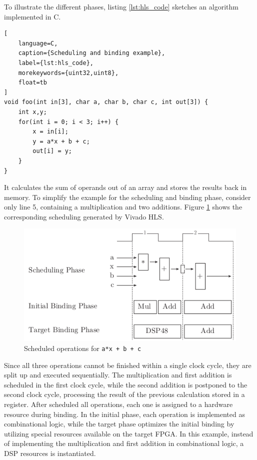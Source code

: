 To illustrate the different phases, listing \ref{lst:hls_code} sketches an
algorithm implemented in C. 
\begin{lstlisting}[
	language=C,
	caption={Scheduling and binding example},
	label={lst:hls_code},
	morekeywords={uint32,uint8},
	float=tb
]
void foo(int in[3], char a, char b, char c, int out[3]) {
	int x,y;
	for(int i = 0; i < 3; i++) {
		x = in[i];
		y = a*x + b + c;
		out[i] = y;
	}
}
\end{lstlisting}
It calculates the sum of operands out of an array and stores the results back
in memory. To simplify the example for the scheduling and binding phase,
consider only line 5, containing a multiplication and two additions. Figure
\ref{fig:hls_sb} shows the corresponding scheduling generated by Vivado
\ac{HLS}.
\begin{figure}[tb]
	\centering
	\includegraphics{../figures/hls_sb}
	\caption{Scheduled operations for \lstinline{a*x + b + c}}
	\label{fig:hls_sb}
\end{figure}
Since all three operations cannot be finished within a single clock cycle,
they are split up and executed sequentially. The multiplication and first
addition is scheduled in the first clock cycle, while the second addition is
postponed to the second clock cycle, processing the result of the previous
calculation stored in a register. After scheduled all operations, each one is
assigned to a hardware resource during binding. In the initial phase, each
operation is implemented as combinational logic, while the target phase
optimizes the initial binding by utilizing special resources available on the
target \ac{FPGA}. In this example, instead of implementing the multiplication
and first addition in combinational logic, a \ac{DSP} resources is
instantiated.

